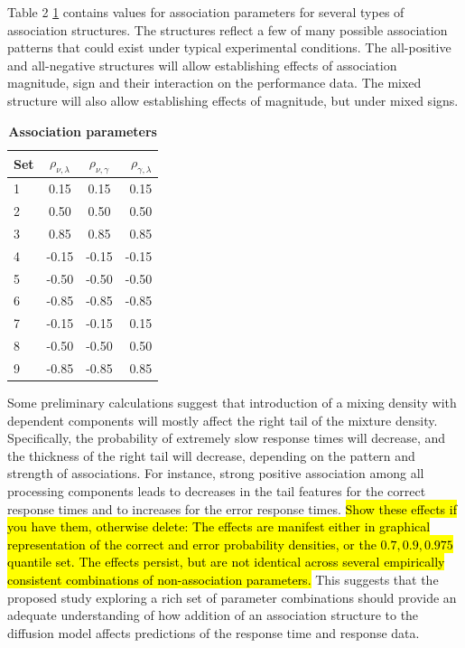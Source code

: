 \documentclass[12pt]{article}
\newcommand{\trish}[1]{\textrm{\hl{#1}}}
\begin{document}
Table 2 \ref{tab:assoc} 
contains values for association
parameters for several types of association structures. The structures
reflect a few of many possible association patterns that could exist
under typical experimental conditions. The all-positive and
all-negative structures will allow establishing effects of association
magnitude, sign and their interaction on the performance data. The
mixed structure will also allow establishing effects of magnitude, but
under mixed signs.
%
\begin{table}[H]
\label{tab:assoc}
\centering
\caption{\textbf{Association parameters}}
\begin{tabular}{|l|c|c|r|}
\hline
Set & $\rho_{\nu,\lambda}$ & $\rho_{\nu,\gamma}$ & $\rho_{\gamma,\lambda}$ \\ \hline
1 & 0.15 & 0.15 & 0.15 \\ \hline
2 & 0.50 & 0.50 & 0.50 \\ \hline
3 & 0.85 & 0.85 & 0.85 \\ \hline
4 & -0.15 & -0.15 & -0.15 \\ \hline
5 & -0.50 & -0.50 & -0.50 \\ \hline
6 & -0.85 & -0.85 & -0.85 \\ \hline
7 & -0.15 & -0.15 & 0.15 \\ \hline
8 & -0.50 & -0.50 & 0.50 \\ \hline
9 & -0.85 & -0.85 & 0.85 \\ \hline
\end{tabular}
\end{table}
%
Some preliminary calculations suggest that introduction of a mixing
density with dependent components will mostly affect the right tail of
the mixture density. Specifically, the probability of extremely slow
response times will decrease, and the thickness of the right tail will
decrease, depending on the pattern and strength of associations. For
instance, strong positive association among all processing
components leads to decreases in the tail features for the
correct response times and to increases for the error response
times. \trish{Show these effects if you have them, otherwise delete:
The effects are manifest either in graphical representation of the
correct and error probability densities, or the ${0.7, 0.9, 0.975}$
quantile set. The effects persist, but are not identical across
several empirically consistent combinations of non-association
parameters.} This suggests that the proposed study exploring a rich
set of parameter combinations should provide an adequate understanding
of how addition of an association structure to the diffusion model
affects predictions of the response time and response data.
\end{document}

